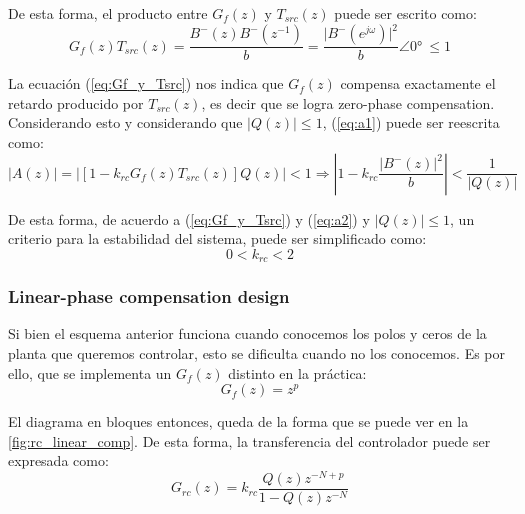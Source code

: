 \documentclass[titlepage, 12pt]{article}
\begin{document}
De esta forma, el producto entre $G_f(z)$ y $T_{src}(z)$ puede ser escrito como:
\begin{equation}
\label{eq:Gf_y_Tsrc}
    G_f(z)T_{src}(z) = \frac{B^-(z)B^-(z^{-1})}{b} = \frac{ \big\lvert B^-(e^{j\omega})\big\rvert^2}{b} \angle \ang{0} \: \leq 1
\end{equation}

La ecuación (\ref{eq:Gf_y_Tsrc}) nos indica que $G_f(z)$ compensa exactamente el retardo producido por $T_{src}(z)$, es decir que se logra zero-phase compensation. Considerando esto y considerando que $\big\lvert Q(z) \big\rvert \leq 1$, (\ref{eq:a1}) puede ser reescrita como:
\begin{equation}
    \label{eq:a2}
        \big\lvert A(z)\big\rvert = \big\lvert [1-k_{rc}G_f(z)T_{src}(z)]Q(z)\big\rvert <1
        \Rightarrow
        \left\lvert 1 - k_{rc} \frac{ \big\lvert B^-(z)\big\rvert^2}{b} \right\rvert < \frac{1}{\big\lvert Q(z) \big\rvert}
    \end{equation}

De esta forma, de acuerdo a (\ref{eq:Gf_y_Tsrc}) y (\ref{eq:a2}) y $\big\lvert Q(z) \big\rvert \leq 1$, un criterio para la estabilidad del sistema, puede ser simplificado como:
\begin{equation}
\label{eq:krc_1}
    0 < k_{rc} < 2
\end{equation}

\subsubsection{Linear-phase compensation design}
Si bien el esquema anterior funciona cuando conocemos los polos y ceros de la planta que queremos controlar, esto se dificulta cuando no los conocemos. Es por ello, que se implementa un $G_f(z)$ distinto en la práctica:
\begin{equation}
\label{eq:gf_real_zp}
    G_f(z) = z^p
\end{equation}

El diagrama en bloques entonces, queda de la forma que se puede ver en la \autoref{fig:rc_linear_comp}. De esta forma, la transferencia del controlador puede ser expresada como:
\begin{equation}
\label{eq:grc_con_linear}
    G_{rc}(z) = k_{rc} \frac{Q(z)z^{-N+p}}{1-Q(z)z^{-N}}
\end{equation}
\end{document}
